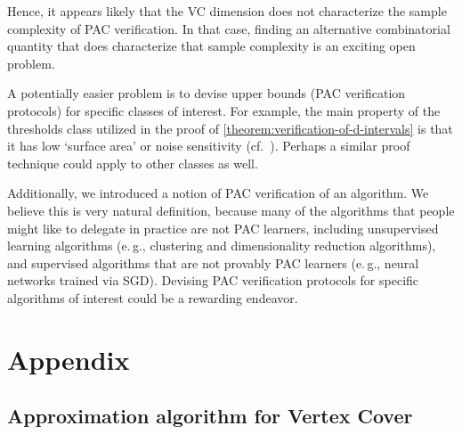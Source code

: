 \documentclass[11pt]{article}
\numberwithin{equation}{section}
\theoremstyle{definition}
\theoremstyle{plain}
\newcommand{\eg}{e.\,g.}
\theoremstyle{definition}\newtheorem{notation}[theorem]{Notation}\theoremstyle{plain}\raggedbottom
\newcommand{\1}{\mathds{1}}
\begin{document}
Hence, it appears likely that the VC dimension does not characterize the sample complexity of PAC verification. In that case, finding an alternative combinatorial quantity that does characterize that sample complexity is an exciting open problem. 

A potentially easier problem is to devise upper bounds (PAC verification protocols) for specific classes of interest. For example, the main property of the thresholds class utilized in the proof of \cref{theorem:verification-of-d-intervals} is that it has low `surface area' or noise sensitivity (cf.\ \cite{BalcanBBY12}). Perhaps a similar proof technique could apply to other classes as well.

Additionally, we introduced a notion of PAC verification of an algorithm. We believe this is very natural definition, because many of the algorithms that people
might like to delegate in practice are not PAC learners, including unsupervised learning algorithms
(\eg, clustering and dimensionality reduction algorithms), and supervised algorithms that are not provably PAC learners (\eg, neural networks trained via SGD). Devising PAC verification protocols for specific algorithms of interest could be a rewarding endeavor.


%
%

%

%

%

%
\section{Appendix}   %

%

%

%
%
\subsection{Approximation algorithm for Vertex Cover} %
\end{document}
